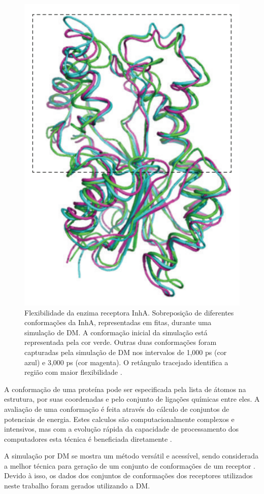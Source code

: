 \begin{figure}[h]
	\center
	\includegraphics[scale=0.4]{images/dm_inha.png}
	\caption{Flexibilidade da enzima receptora InhA. Sobreposição de diferentes conformações da InhA, representadas em fitas, durante uma simulação de DM. A conformação inicial da simulação está representada pela cor verde. Outras duas conformações foram capturadas pela simulação de DM nos intervalos de 1,000 ps (cor azul) e 3,000 ps (cor magenta). O retângulo tracejado identifica a região com maior flexibilidade \cite{REN13}.}
	\label{fig:dm}
\end{figure}

A conformação de uma proteína pode ser especificada pela lista de átomos na estrutura, por suas coordenadas e pelo conjunto de ligações químicas entre eles. A avaliação de uma conformação é feita através do cálculo de conjuntos de potenciais de energia. Estes calculos são computacionalmente complexos e intensivos, mas com a evolução rápida da capacidade de processamento dos computadores esta técnica é beneficiada diretamente \cite{art08}.

A simulação por DM se mostra um método versátil e acessível, sendo considerada a melhor técnica para geração de um conjunto de conformações de um receptor \cite{kar11}. Devido à isso, os dados dos conjuntos de conformações dos receptores utilizados neste trabalho foram gerados utilizando a DM.


